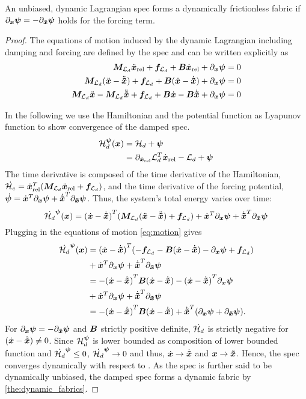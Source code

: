 \begin{lemma}
An unbiased, dynamic Lagrangian spec forms a dynamically frictionless
fabric if  $\partial_{\bm{x}}\bm{\psi} = -\partial_{\bm{\tilde{x}}}\bm{\psi}$ holds for the forcing term.
\label{lem:dynamic_lagrangian_fabrics}
\end{lemma}
\begin{proof}
The equations of motion induced by the dynamic Lagrangian including damping and forcing 
are defined by the spec and can
be written explicitly as
\begin{align}
  \bm{M}_{\mathcal{L}_d}\ddot{\bm{x}}_{\textrm{rel}} + \bm{f}_{\mathcal{L}_d} + \bm{B}\dot{\bm{x}}_{\textrm{rel}} + \partial_{\bm{x}}\bm{\psi} = 0 \nonumber \\
  \bm{M}_{\mathcal{L}_d}(\ddot{\bm{x}} - \ddot{\bm{\tilde{x}}}) + \bm{f}_{\mathcal{L}_d} + \bm{B}(\dot{\bm{x}} - \dot{\bm{\tilde{x}}}) + \partial_{\bm{x}}\bm{\psi} = 0
\label{eq:motion} \\
  \bm{M}_{\mathcal{L}_d}\ddot{\bm{x}} - \bm{M}_{\mathcal{L}_d}\ddot{\bm{\tilde{x}}} + \bm{f}_{\mathcal{L}_d} + \bm{B}\dot{\bm{x}} - \bm{B}\dot{\bm{\tilde{x}}} +
    \partial_{\bm{x}}\bm{\psi} = 0 \nonumber
\end{align}

In the following we use the Hamiltonian and the potential function as Lyapunov function to
show convergence of the damped spec.
\begin{align*}
  \mathcal{H}_d^{\bm{\psi}}(\bm{x}) &= \mathcal{H}_d + \bm{\psi} \\
  &= \partial_{\dot{\bm{x}}_{\textrm{rel}}}\mathcal{L}_d^T\dot{\bm{x}}_{\textrm{rel}} - \mathcal{L}_d + \bm{\psi}
\end{align*}
The time derivative is composed of the time derivative of the Hamiltonian,\newline
$\dot{\mathcal{H}_e} = \dot{\bm{x}}_{\textrm{rel}}^T (\bm{M}_{\mathcal{L}_d}\ddot{\bm{x}}_{\textrm{rel}} + \bm{f}_{\mathcal{L}_d})$,
and the time derivative of the forcing potential, 
$\dot{\bm{\psi}} = \dot{\bm{x}}^T\partial_{\bm{x}}\bm{\psi} + \dot{\bm{\tilde{x}}}^T\partial_{\bm{\tilde{x}}}\bm{\psi}$.
Thus, the system's total energy varies over time:
\[
  \dot{\mathcal{H}_d}^{\bm{\psi}}(\bm{x}) = {(\dot{\bm{x}} - \dot{\bm{\tilde{x}}})}^T(\bm{M}_{\mathcal{L}_d} (\ddot{\bm{x}} - \ddot{\bm{\tilde{x}}}) + \bm{f}_{\mathcal{L}_d}) +
\dot{\bm{x}}^T\partial_{\bm{x}}\bm{\psi} + \dot{\bm{\tilde{x}}}^T\partial_{\bm{\tilde{x}}}\bm{\psi}
\]
Plugging in the equations of motion \cref{eq:motion} gives
\begin{align*}
  \dot{\mathcal{H}_d}^{\bm{\psi}}(\bm{x}) &= {(\dot{\bm{x}} - \dot{\bm{\tilde{x}}})}^T(-\bm{f}_{\mathcal{L}_d} - \bm{B}(\dot{\bm{x}} - \dot{\bm{\tilde{x}}}) - \partial_{\bm{x}}\bm{\psi} +
    \bm{f}_{\mathcal{L}_d}) \\
  &  + \dot{\bm{x}}^T\partial_{\bm{x}}\bm{\psi} + \dot{\bm{\tilde{x}}}^T\partial_{\bm{\tilde{x}}}\bm{\psi} \\
  &= -{(\dot{\bm{x}} - \dot{\bm{\tilde{x}}})}^T\bm{B}(\dot{\bm{x}} - \dot{\bm{\tilde{x}}}) - {(\dot{\bm{x}} - \dot{\bm{\tilde{x}}})}^T\partial_{\bm{x}}\bm{\psi} \\
  & + \dot{\bm{x}}^T\partial_{\bm{x}}\bm{\psi} + \dot{\bm{\tilde{x}}}^T\partial_{\bm{\tilde{x}}}\bm{\psi} \\
  &= -{(\dot{\bm{x}} - \dot{\bm{\tilde{x}}})}^T\bm{B}(\dot{\bm{x}} - \dot{\bm{\tilde{x}}})
    + \dot{\bm{\tilde{x}}}^T(\partial_{\bm{x}}\bm{\psi} + \partial_{\bm{\tilde{x}}}\bm{\psi}).
\end{align*}
For $\partial_{\bm{x}}\bm{\psi} = -\partial_{\bm{\tilde{x}}}\bm{\psi}$ and $\bm{B}$ strictly positive definite,
$\dot{\mathcal{H}_d}$ is strictly negative for $(\dot{\bm{x}} - \dot{\bm{\tilde{x}}}) \neq 0$. Since $\mathcal{H}_d^{\bm{\psi}}$ is lower
bounded as composition of lower bounded function and $\dot{\mathcal{H}_d}^{\bm{\psi}} \leq 0$,
$\dot{\mathcal{H}_d}^{\bm{\psi}} \to 0$ and thus, $\dot{\bm{x}} \to \dot{\bm{\tilde{x}}}$ and $\bm{x} \to \bm{\tilde{x}}$. Hence, the spec
converges dynamically with respect to \xt{}.
As the spec is further said to be
dynamically unbiased, the damped spec forms a dynamic fabric by \cref{the:dynamic_fabrics}.
\end{proof}

